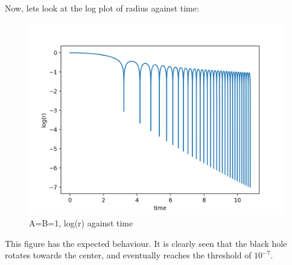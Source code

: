 \documentclass[12pt,letterpaper]{article}
\begin{document}
\begin{enumerate}
    \clearpage
    Now, lets look at the log plot of radius against time:
    
    \begin{figure}[h]
    \centering
    \includegraphics[width=1.\linewidth]{fig2e}
    \caption{A=B=1, log(r) against time}
    \end{figure}
    
    This figure has the expected behaviour. It is clearly seen that the black hole rotates towards the center, and eventually reaches the threshold of $10^{-7}$.
    

\end{enumerate}
\end{document}
